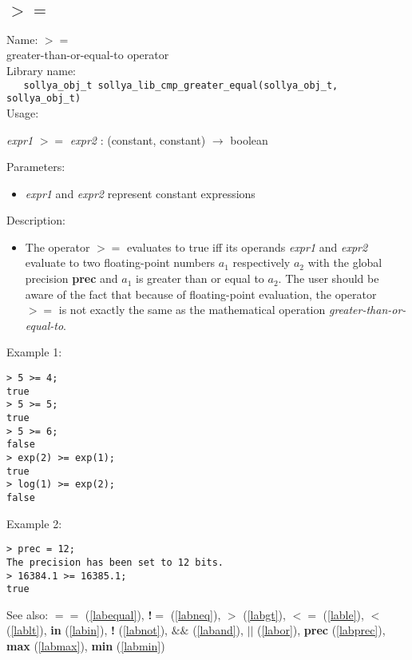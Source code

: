 \subsection{$>=$}
\label{labge}
\noindent Name: \textbf{$>=$}\\
\phantom{aaa}greater-than-or-equal-to operator\\[0.2cm]
\noindent Library name:\\
\verb|   sollya_obj_t sollya_lib_cmp_greater_equal(sollya_obj_t, sollya_obj_t)|\\[0.2cm]
\noindent Usage: 
\begin{center}
\emph{expr1} \textbf{$>=$} \emph{expr2} : (\textsf{constant}, \textsf{constant}) $\rightarrow$ \textsf{boolean}\\
\end{center}
Parameters: 
\begin{itemize}
\item \emph{expr1} and \emph{expr2} represent constant expressions
\end{itemize}
\noindent Description: \begin{itemize}

\item The operator \textbf{$>=$} evaluates to true iff its operands \emph{expr1} and
   \emph{expr2} evaluate to two floating-point numbers $a_1$
   respectively $a_2$ with the global precision \textbf{prec} and
   $a_1$ is greater than or equal to $a_2$. The user should
   be aware of the fact that because of floating-point evaluation, the
   operator \textbf{$>=$} is not exactly the same as the mathematical
   operation \emph{greater-than-or-equal-to}.
\end{itemize}
\noindent Example 1: 
\begin{center}\begin{minipage}{15cm}\begin{Verbatim}[frame=single,commandchars=\\\|\~]
> 5 >= 4;
true
> 5 >= 5;
true
> 5 >= 6;
false
> exp(2) >= exp(1);
true
> log(1) >= exp(2);
false
\end{Verbatim}
\end{minipage}\end{center}
\noindent Example 2: 
\begin{center}\begin{minipage}{15cm}\begin{Verbatim}[frame=single,commandchars=\\\|\~]
> prec = 12;
The precision has been set to 12 bits.
> 16384.1 >= 16385.1;
true
\end{Verbatim}
\end{minipage}\end{center}
See also: \textbf{$==$} (\ref{labequal}), \textbf{!$=$} (\ref{labneq}), \textbf{$>$} (\ref{labgt}), \textbf{$<=$} (\ref{lable}), \textbf{$<$} (\ref{lablt}), \textbf{in} (\ref{labin}), \textbf{!} (\ref{labnot}), \textbf{$\&\&$} (\ref{laband}), \textbf{$||$} (\ref{labor}), \textbf{prec} (\ref{labprec}), \textbf{max} (\ref{labmax}), \textbf{min} (\ref{labmin})
